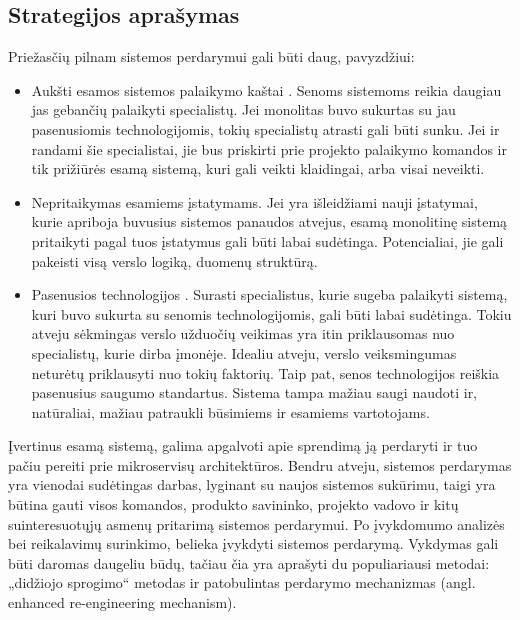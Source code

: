 \documentclass[fleqn]{VUMIFPSkursinis}
\begin{document}
\subsection{Strategijos aprašymas}
Priežasčių pilnam sistemos perdarymui gali būti daug, pavyzdžiui:
\begin{itemize}
    \item Aukšti esamos sistemos palaikymo kaštai \cite{Gli21}. Senoms sistemoms reikia daugiau jas gebančių palaikyti specialistų. Jei monolitas buvo sukurtas su jau pasenusiomis technologijomis, tokių specialistų atrasti gali būti sunku. Jei ir randami šie specialistai, jie bus priskirti prie projekto palaikymo komandos ir tik prižiūrės esamą sistemą, kuri gali veikti klaidingai, arba visai neveikti.
    
    \item Nepritaikymas esamiems įstatymams. Jei yra išleidžiami nauji įstatymai, kurie apriboja buvusius sistemos panaudos atvejus, esamą monolitinę sistemą pritaikyti pagal tuos įstatymus gali būti labai sudėtinga. Potencialiai, jie gali pakeisti visą verslo logiką, duomenų struktūrą.
    
    \item Pasenusios technologijos \cite{MQO18}. Surasti specialistus, kurie sugeba palaikyti sistemą, kuri buvo sukurta su senomis technologijomis, gali būti labai sudėtinga. Tokiu atveju sėkmingas verslo užduočių veikimas  yra itin priklausomas nuo specialistų, kurie dirba įmonėje. Idealiu atveju, verslo veiksmingumas neturėtų priklausyti nuo tokių faktorių. Taip pat, senos technologijos reiškia pasenusius saugumo standartus. Sistema tampa mažiau saugi naudoti ir, natūraliai, mažiau patraukli būsimiems ir esamiems vartotojams.\\
\end{itemize}

Įvertinus esamą sistemą, galima apgalvoti apie sprendimą ją perdaryti ir tuo pačiu pereiti prie mikroservisų architektūros. Bendru atveju, sistemos perdarymas yra vienodai sudėtingas darbas, lyginant su naujos sistemos sukūrimu, taigi yra būtina gauti visos komandos, produkto savininko, projekto vadovo ir kitų suinteresuotųjų asmenų pritarimą sistemos perdarymui. Po įvykdomumo analizės bei reikalavimų surinkimo, belieka įvykdyti sistemos perdarymą. Vykdymas gali būti daromas daugeliu būdų, tačiau čia yra aprašyti du populiariausi metodai: „didžiojo sprogimo“ \cite{Ngu11} metodas ir patobulintas perdarymo mechanizmas \cite{MQO18} (angl. enhanced re-engineering mechanism).
\end{document}
